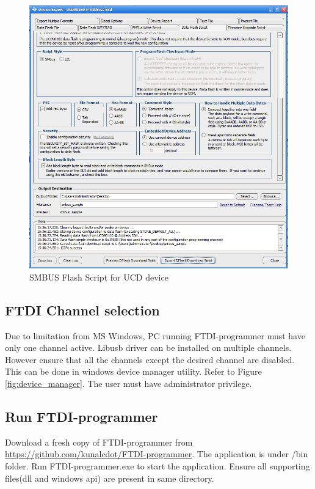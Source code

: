 \documentclass[a4paper,12pt]{report}%
\begin{document}
		\begin{figure}[p]
				
				\centering
				\includegraphics[scale = 0.7]{smbus_flash_script_generation}
				\caption{SMBUS Flash Script for UCD device}
				\label{fig:smbus_script}
			\end{figure}
	
	
	
	
	
	\subsection{FTDI Channel selection}
	Due to limitation from MS Windows, PC running FTDI-programmer must have only one channel active. Libusb driver 
	can be installed on multiple channels. However ensure that all the channels except the desired channel are disabled.
	This can be done in windows device manager utility. Refer to Figure \ref{fig:device_manager}. The user must have
	administrator privilege. 
	
	
	\subsection{Run FTDI-programmer}
	Download a fresh copy of FTDI-programmer from \url{https://github.com/kunalcdot/FTDI-programmer}. The application is 
	under /bin folder. Run FTDI-programmer.exe to start the application. Ensure all supporting files(dll and windows api)
	are present in same directory.
	
\end{document}
